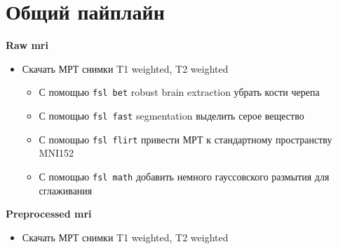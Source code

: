 \documentclass[a4paper, 10pt]{article}
\begin{document}
\section{Общий пайплайн}

\begin{minipage}[t]{0.5\textwidth}
    \textbf{Raw mri}
    \begin{itemize}
        \item Скачать МРТ снимки T1 weighted, T2 weighted 
        \begin{itemize}
            \item С помощью \texttt{fsl bet} robust brain extraction убрать кости черепа
            \item С помощью \texttt{fsl fast} segmentation выделить серое вещество
            \item С помощью \texttt{fsl flirt} привести МРТ к стандартному пространству MNI152
            \item С помощью \texttt{fsl math} добавить немного гауссовского размытия для сглаживания
        \end{itemize}
    \end{itemize}
\end{minipage}
\hfill
\begin{minipage}[t]{0.4\textwidth}
    \textbf{Preprocessed mri}
    \begin{itemize}
        \item Скачать МРТ снимки T1 weighted, T2 weighted 
    \end{itemize}
\end{minipage}
\end{document}
